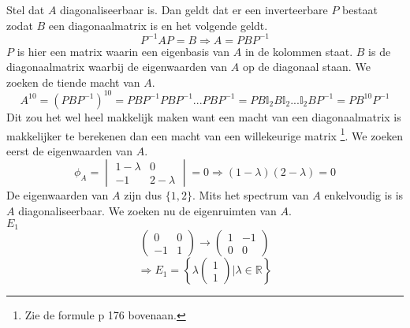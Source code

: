 \documentclass[lineaire_algebra_oplossingen.tex]{subfiles}
\begin{document}
Stel dat $A$ diagonaliseerbaar is. Dan geldt dat er een inverteerbare $P$ bestaat zodat $B$ een diagonaalmatrix is en het volgende geldt.
\[
P^{-1}AP = B \Rightarrow A = PBP^{-1}
\]
$P$ is hier een matrix waarin een eigenbasis van $A$ in de kolommen staat. $B$ is de diagonaalmatrix waarbij de eigenwaarden van $A$ op de diagonaal staan.
We zoeken de tiende macht van $A$.
\[
A^{10} = (PBP^{-1})^{10} = PBP^{-1}PBP^{-1}...PBP^{-1} = PB\mathbb{I}_2B\mathbb{I}_2...\mathbb{I}_2BP^{-1} = PB^{10}P^{-1}
\]
Dit zou het wel heel makkelijk maken want een macht van een diagonaalmatrix is makkelijker te berekenen dan een macht van een willekeurige matrix \footnote{Zie de formule p 176 bovenaan.}.
We zoeken eerst de eigenwaarden van $A$.
\[
\phi_A =
\begin{vmatrix}
1-\lambda & 0\\
-1 & 2-\lambda
\end{vmatrix}
= 0
\Rightarrow (1-\lambda)(2-\lambda)=0
\]
De eigenwaarden van $A$ zijn dus $\{1,2\}$. Mits het spectrum van $A$ enkelvoudig is is $A$ diagonaliseerbaar.
We zoeken nu de eigenruimten van $A$.\\

\emph{$E_1$}\\
\[
\begin{pmatrix}
0 & 0\\
-1 & 1
\end{pmatrix}
\rightarrow
\begin{pmatrix}
1 & -1\\
0 & 0
\end{pmatrix}
\]
\[
\Rightarrow 
E_1 = 
\left\{
\lambda
\begin{pmatrix}
1\\1
\end{pmatrix}
| \lambda \in \mathbb{R}
\right\}
\]
\end{document}

